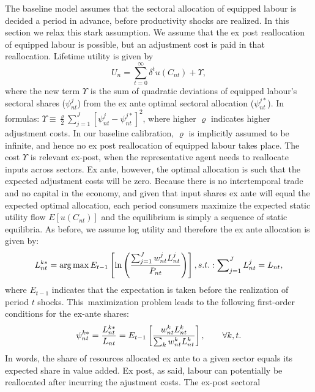 \documentclass[12pt]{article}
\begin{document}
The baseline model assumes that the sectoral allocation of equipped labour
is decided a period in advance, before productivity shocks are realized. In
this section we relax this stark assumption. We assume that the ex post
reallocation of equipped labour is possible, but an adjustment cost is paid
in that reallocation. Lifetime utility is given by 
\begin{equation*}
U_{n}=\sum\limits_{t=0}^{\infty }\delta ^{t}u(C_{nt})+\Upsilon ,
\end{equation*}%
where the new term $\Upsilon $ is the sum of quadratic deviations of
equipped labour's sectoral shares ($\psi _{nt}^{j}$) from the ex ante
optimal sectoral allocation ($\psi _{nt}^{j\ast }$). In formulas: $\Upsilon
\equiv \frac{\varrho }{2}\sum_{j=1}^{J}\left[ \psi _{nt}^{j}-\psi
_{nt}^{j\ast }\right] ^{2}$, where higher $\varrho $ indicates higher
adjustment costs. In our baseline calibration, $\varrho $ is implicitly
assumed to be infinite, and hence no ex post reallocation of equipped labour
takes place. The cost $\Upsilon $ is relevant ex-post, when the
representative agent needs to reallocate inputs across sectors. Ex ante,
however, the optimal allocation is such that the expected adjustment costs
will be zero. Because there is no intertemporal trade and no capital in the
economy, and given that input shares ex ante will equal the expected optimal
allocation, each period consumers maximize the expected static utility flow $%
E\left[ u\left( C_{nt}\right) \right] $ and the equilibrium is simply a
sequence of static equilibria. As before, we assume log utility and
therefore the ex ante allocation is given by: 
\begin{equation}
L_{nt}^{k\ast }=\arg \max E_{t-1}\left[ \ln \left( \frac{%
\sum_{j=1}^{J}w_{nt}^{j}L_{nt}^{j}}{P_{nt}}\right) \right]
,s.t.:\sum\nolimits_{j=1}^{J}L_{nt}^{j}=L_{nt},  \label{eq:log:utility1}
\end{equation}%
where $E_{t-1}$ indicates that the expectation is taken before the
realization of period $t$ shocks. This\ maximization problem leads to the
following first-order conditions for the ex-ante shares: 
\begin{equation}
\psi _{nt}^{k\ast }=\frac{L_{nt}^{k\ast }}{L_{nt}}=E_{t-1}\left[ \frac{%
w_{nt}^{k}L_{nt}^{k}}{\sum_{k}w_{nt}^{k}L_{nt}^{k}}\right] ,\qquad \forall
k,t.  \label{foc1}
\end{equation}%
In words, the share of resources allocated ex ante to a given sector equals
its expected share in value added. Ex post, as said, labour can potentially
be reallocated after incurring the ajustment costs. The ex-post sectoral
\end{document}
